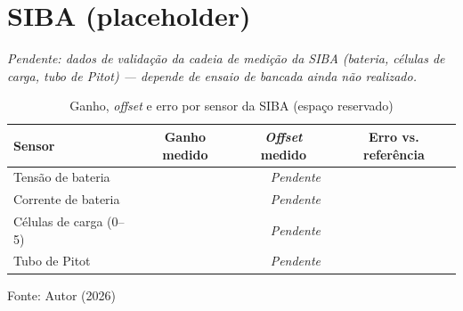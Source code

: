 \section{SIBA (placeholder)}
\label{sec:resultado_validacao_siba}

\textit{Pendente: dados de validação da cadeia de medição da SIBA (bateria,
células de carga, tubo de Pitot) --- depende de ensaio de bancada ainda não
realizado.}

\begin{table}[H]
    \centering
    \caption{Ganho, \textit{offset} e erro por sensor da SIBA (espaço reservado)}
    \label{tab:resultado_validacao_siba}
    \begin{tabular}{lccc}
        \toprule
        \textbf{Sensor} & \textbf{Ganho medido} & \textbf{\textit{Offset} medido} & \textbf{Erro vs. referência} \\
        \midrule
        Tensão de bateria & \multicolumn{3}{c}{\textit{Pendente}} \\
        Corrente de bateria & \multicolumn{3}{c}{\textit{Pendente}} \\
        Células de carga (0--5) & \multicolumn{3}{c}{\textit{Pendente}} \\
        Tubo de Pitot & \multicolumn{3}{c}{\textit{Pendente}} \\
        \bottomrule
    \end{tabular}

    \vspace{2pt}
    {\small Fonte: Autor (2026)}
\end{table}
